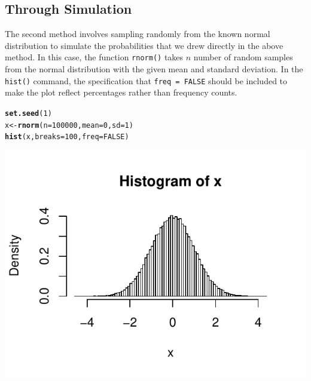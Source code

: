 \documentclass{report}\usepackage[]{graphicx}\usepackage[]{color}
\makeatletter
\def\maxwidth{ %
  \ifdim\Gin@nat@width>\linewidth
    \linewidth
  \else
    \Gin@nat@width
  \fi
}
\newcommand{\hlnum}[1]{\textcolor[rgb]{0.686,0.059,0.569}{#1}}%
\newcommand{\hlstd}[1]{\textcolor[rgb]{0.345,0.345,0.345}{#1}}%
\newcommand{\hlkwb}[1]{\textcolor[rgb]{0.69,0.353,0.396}{#1}}%
\newcommand{\hlkwc}[1]{\textcolor[rgb]{0.333,0.667,0.333}{#1}}%
\newcommand{\hlkwd}[1]{\textcolor[rgb]{0.737,0.353,0.396}{\textbf{#1}}}%
\newenvironment{kframe}{%
 \def\at@end@of@kframe{}%
 \ifinner\ifhmode%
  \def\at@end@of@kframe{\end{minipage}}%
  \begin{minipage}{\columnwidth}%
 \fi\fi%
 \def\FrameCommand##1{\hskip\@totalleftmargin \hskip-\fboxsep
 \colorbox{shadecolor}{##1}\hskip-\fboxsep
     \hskip-\linewidth \hskip-\@totalleftmargin \hskip\columnwidth}%
 \MakeFramed {\advance\hsize-\width
   \@totalleftmargin\z@ \linewidth\hsize
   \@setminipage}}%
 {\par\unskip\endMakeFramed%
 \at@end@of@kframe}
\newenvironment{knitrout}{}{} %
\makeatother
\begin{document}
\subsection{Through Simulation}
The second method involves sampling randomly from the known normal distribution to simulate the probabilities that we drew directly in the above method.  In this case, the function \texttt{rnorm()} takes $n$ number of random samples from the normal distribution with the given mean and standard deviation.  In the \texttt{hist()} command, the specification that \texttt{freq = FALSE} should be included to make the plot reflect percentages rather than frequency counts.  
\begin{knitrout}
\color{fgcolor}\begin{kframe}
\begin{alltt}
\hlkwd{set.seed}\hlstd{(}\hlnum{1}\hlstd{)}
\hlstd{x} \hlkwb{<-} \hlkwd{rnorm}\hlstd{(}\hlkwc{n} \hlstd{=} \hlnum{100000}\hlstd{,} \hlkwc{mean} \hlstd{=} \hlnum{0}\hlstd{,} \hlkwc{sd} \hlstd{=} \hlnum{1}\hlstd{)}
\hlkwd{hist}\hlstd{(x,} \hlkwc{breaks} \hlstd{=} \hlnum{100}\hlstd{,} \hlkwc{freq} \hlstd{=} \hlnum{FALSE}\hlstd{)}
\end{alltt}
\end{kframe}

{\centering \includegraphics[width=\maxwidth]{figure/unnamed-chunk-52-1} 

}



\end{knitrout}
\end{document}
